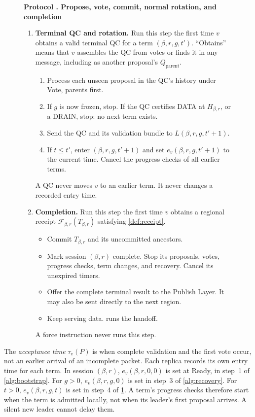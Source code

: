 \documentclass[11pt,a4paper]{article}
\newcommand{\RR}[1]{{\color{rrRed}#1}}
\newcommand{\FC}{\mathcal F}
\newcommand{\defterm}[1]{\textcolor{rrBlue}{\textit{#1}}}
\newcounter{protocol}
\newenvironment{protocol}[3][htbp]{\begin{figure}[#1]\refstepcounter{protocol}\label{#2}
\begin{mdframed}[linewidth=.6pt,skipabove=0pt,skipbelow=0pt,
innertopmargin=7pt,innerbottommargin=7pt]\small
\textbf{Protocol \theprotocol. #3}\par\smallskip}{\end{mdframed}\end{figure}}
\begin{document}
\begin{protocol}{alg:steady}{Propose, vote, commit, normal rotation\RR{, and completion}}
\begin{enumerate}[label=\textbf{\arabic*)},itemsep=3pt]
\item \textbf{Terminal QC and rotation.} Run this step the first time
$v$ obtains a valid terminal QC for a term $(\beta,r,g,t')$.
``Obtains'' means that $v$ assembles the QC from votes or finds it in
any message, including as another proposal's $Q_{\mathrm{parent}}$.
 \begin{enumerate}[label=(\alph*)]
 \item Process each unseen proposal in the QC's history under Vote,
       parents first.
 \item If $g$ is now frozen, stop. \RR{If the QC certifies DATA at
       $H_{\beta,r}$, or a DRAIN, stop: no next term exists.}
 \item Send the QC and its validation bundle to $L(\beta,r,g,t'+1)$.
 \item If $t\le t'$, enter $(\beta,r,g,t'+1)$ and set $e_v(\beta,r,g,t'+1)$ to the
       current time. Cancel the progress checks of all earlier
       terms.
 \end{enumerate}
 A QC never moves $v$ to an earlier term. It never changes a recorded
 entry time.

\item \RR{\textbf{Completion.} Run this step the first time $v$ obtains a
regional receipt $\FC_{\beta,r}(T_{\beta,r})$ satisfying \cref{def:receipt}.}
 \begin{itemize}\color{rrRed}
 \item Commit $T_{\beta,r}$ and its uncommitted ancestors.
 \item Mark session $(\beta,r)$ complete. Stop its proposals, votes, progress
       checks, term changes, and recovery. Cancel its unexpired timers.
 \item Offer the complete terminal result to the Publish Layer.
       It may also be sent directly to the next region.
 \item Keep serving data.  runs the handoff.
 \end{itemize}
 \RR{A force instruction never runs this step.}
\end{enumerate}
\end{protocol}

The \defterm{acceptance time} $\tau_v(P)$ is when complete validation and the first
vote occur, not an earlier arrival of an incomplete packet. Each replica
records its own entry time for each term. In session $(\beta,r)$, $e_v(\beta,r,0,0)$ is
set at Ready, in step~1 of \cref{alg:bootstrap}. For $g>0$, $e_v(\beta,r,g,0)$ is
set in step~3 of \cref{alg:recovery}. For $t>0$, $e_v(\beta,r,g,t)$ is set in
step~4 of \cref{alg:steady}. A term's progress checks therefore start
when the term is admitted locally, not when its leader's first proposal
arrives. A silent new leader cannot delay them.
\end{document}
